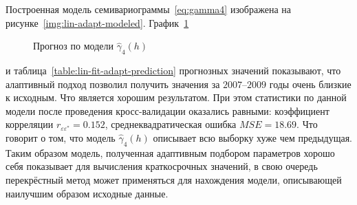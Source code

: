 Построенная модель семивариограммы~\eqref{eq:gamma4} изображена на рисунке~\ref{img:lin-adapt-modeled}. График~\ref{img:lin-adapt-pred}
\begin{figure}[ht]
\caption{Прогноз по модели $ \widehat{\gamma}_4(h) $}
\label{img:lin-adapt-pred}
\end{figure}
и таблица~\ref{table:lin-fit-adapt-prediction} прогнозных значений показывают, что алаптивный подход позволил получить значения за $ 2007 $--$ 2009 $ годы очень близкие к исходным. Что является хорошим результатом. При этом статистики по данной модели после проведения кросс-валидации оказались равными: коэффициент корреляции $ r_{\varepsilon\varepsilon^{*}} = 0.152 $, среднеквадратическая ошибка $ MSE = 18.69 $. Что говорит о том, что модель $ \widehat{\gamma}_4(h) $ описывает всю выборку хуже чем предыдущая. Таким образом модель, полученная адаптивным подбором параметров хорошо себя показывает для вычисления краткосрочных значений, в свою очередь перекрёстный метод может применяться для нахождения модели, описывающей наилучшим образом исходные данные.


